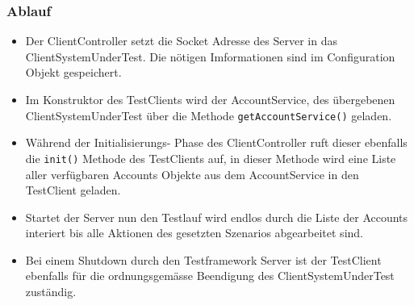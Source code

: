 \subsubsection{Ablauf}
\label{sec:ablauf}
\begin{itemize}
\item Der ClientController setzt die Socket Adresse des Server in das Client\-System\-Under\-Test. Die nötigen Imformationen sind im Configuration Objekt gespeichert.
\item Im Kon\-struk\-tor des Test\-Clients wird der Account\-Ser\-vice, des über\-ge\-be\-nen Client\-System\-Under\-Test über die Meth\-ode \texttt{get\allowbreak Account\allowbreak Ser\allowbreak vice()} ge\-la\-den. 
\item Während der Initialisierungs- Phase des ClientController ruft dieser ebenfalls die \verb+init()+ Methode des TestClients auf, in dieser Methode wird eine Liste aller verfügbaren Accounts Objekte aus dem AccountService in den TestClient geladen.
\item Startet der Server nun den Testlauf wird endlos durch die Liste der Accounts interiert bis alle Aktionen des gesetzten Szenarios abgearbeitet sind.
\item Bei einem Shutdown durch den Testframework Server ist der TestClient ebenfalls für die ord\-nungs\-ge\-mä\-sse Be\-en\-di\-gung des ClientSystemUnderTest zu\-stän\-dig.
\end{itemize}

